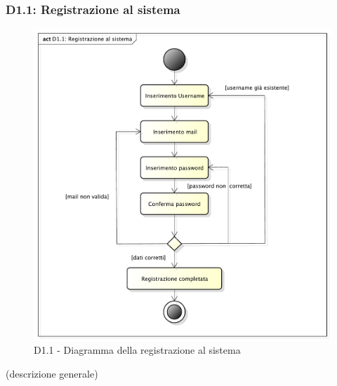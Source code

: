 		\subsubsection{D1.1: Registrazione al sistema} %
		\label{ssub:registrazione_al_sistema}
		\begin{figure}[!htbp]
			\centering
			\centerline{\includegraphics[scale=0.45]{./images/D1_1.pdf}}
			\caption{D1.1 - Diagramma della registrazione al sistema}
		\end{figure}
		\noindent
		[TO DO] (descrizione generale)

